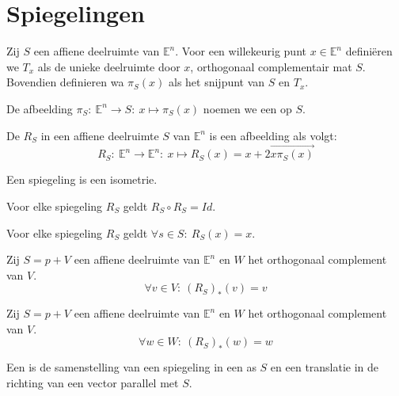 \documentclass[main.tex]{subfiles}
\begin{document}
\section{Spiegelingen}
\label{sec:spiegelingen}

\begin{de}
  Zij $S$ een affiene deelruimte van $\mathbb{E}^{n}$.
  Voor een willekeurig punt $x\in \mathbb{E}^{n}$ defini\"eren we $T_{x}$ als de unieke deelruimte door $x$, orthogonaal complementair mat $S$.
  Bovendien definieren wa $\pi_{S}(x)$ als het snijpunt van $S$ en $T_{x}$.
\end{de}
 
\begin{de}
  De afbeelding $\pi_{S}:\ \mathbb{E}^{n} \rightarrow S:\ x \mapsto \pi_{S}(x)$ noemen we een  op $S$.
\end{de}

\begin{de}
  De  $R_{S}$ in een affiene deelruimte $S$ van $\mathbb{E}^{n}$ is een afbeelding als volgt:
  \[ R_{S}:\ \mathbb{E}^{n} \rightarrow \mathbb{E}^{n}:\ x \mapsto R_{S}(x) = x + 2\overrightarrow{x\pi_{S}(x)} \]
\end{de}

\begin{st}
  Een spiegeling is een isometrie.
\end{st}

\begin{st}
  Voor elke spiegeling $R_{S}$ geldt $R_{S} \circ R_{S} = Id$.
\end{st}

\begin{st}
  Voor elke spiegeling $R_{S}$ geldt $\forall s \in S:\ R_{S}(x) = x$.
\end{st}

\begin{lem}
  Zij $S=p+V$ een affiene deelruimte van $\mathbb{E}^{n}$ en $W$ het orthogonaal complement van $V$.
  \[ \forall v\in V:\ (R_{S})_{*}(v) = v \]
\end{lem}

\begin{lem}
  Zij $S=p+V$ een affiene deelruimte van $\mathbb{E}^{n}$ en $W$ het orthogonaal complement van $V$.
  \[ \forall w\in W:\ (R_{S})_{*}(w) = w \]
\end{lem}

\begin{de}
  Een  is de samenstelling van een spiegeling in een as $S$ en een translatie in de richting van een vector parallel met $S$.
\end{de}
\end{document}
